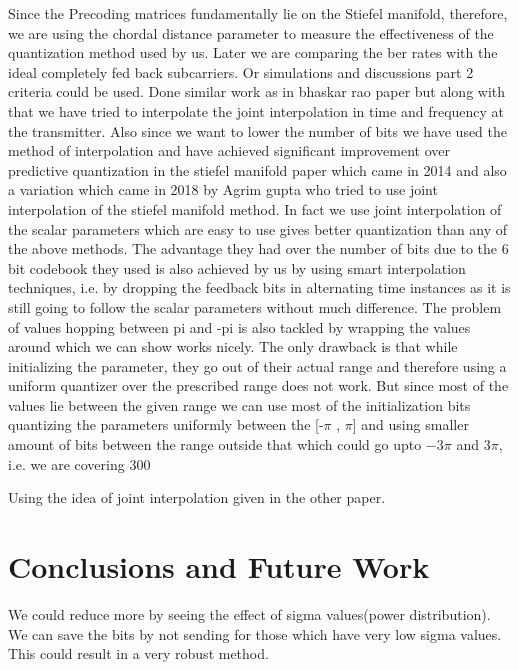 \documentclass[conference]{IEEEtran}
\begin{document}
\noindent Since the Precoding matrices fundamentally lie on the Stiefel manifold, therefore, we are using the chordal distance parameter to measure the effectiveness of the quantization method used by us. Later we are comparing the ber rates with the ideal completely fed back subcarriers. Or simulations and discussions part 2 criteria could be used. Done similar work as in bhaskar rao paper but along with that we have tried to interpolate the joint interpolation in time and frequency at the transmitter. Also since we want to lower the number of bits we have used the method of interpolation and have achieved significant improvement over predictive quantization in the stiefel manifold paper which came in 2014 and also a variation which came in 2018 by Agrim gupta who tried to use joint interpolation of the stiefel manifold method. In fact we use joint interpolation of the scalar parameters which are easy to use gives better quantization than any of the above methods. 
The advantage they had over the number of bits due to the 6 bit codebook they used is also achieved by us by using smart interpolation techniques, i.e. by dropping the feedback bits in alternating time instances as it is still going to follow the scalar parameters without much difference. 
The problem of values hopping between pi and -pi is also tackled by wrapping the values around which we can show works nicely. The only drawback is that while initializing the parameter, they go out of their actual range and therefore using a uniform quantizer over the prescribed range does not work. But since most of the values lie between the given range we can use most of the initialization bits quantizing the parameters uniformly between the [-$\pi$ , $\pi$] and using smaller amount of bits between the range outside that which could go upto $-3\pi$ and $3\pi$, i.e. we are covering 300%

Using the idea of joint interpolation given in the other paper.  



\section{Conclusions and Future Work}
\label{section4}

We could reduce more by seeing the effect of sigma values(power distribution). We can save the bits by not sending for those which have very low sigma values. This could result in a very robust method.
\end{document}
